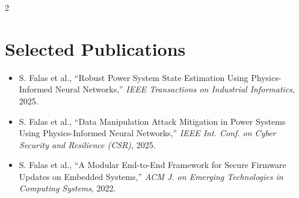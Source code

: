 \documentclass[10pt,a4paper]{article}
\begin{document}
\begin{multicols}{2}
\section*{Selected Publications}
\footnotesize
\begin{itemize}
  \item S. Falas et al., ``Robust Power System State Estimation Using Physics-Informed Neural Networks,'' \textit{IEEE Transactions on Industrial Informatics}, 2025.
  \item S. Falas et al., ``Data Manipulation Attack Mitigation in Power Systems Using Physics-Informed Neural Networks,'' \textit{IEEE Int. Conf. on Cyber Security and Resilience (CSR)}, 2025.
  \item S. Falas et al., ``A Modular End-to-End Framework for Secure Firmware Updates on Embedded Systems,'' \textit{ACM J. on Emerging Technologies in Computing Systems}, 2022.
\end{itemize}
\normalsize

\end{multicols}
\end{document}

